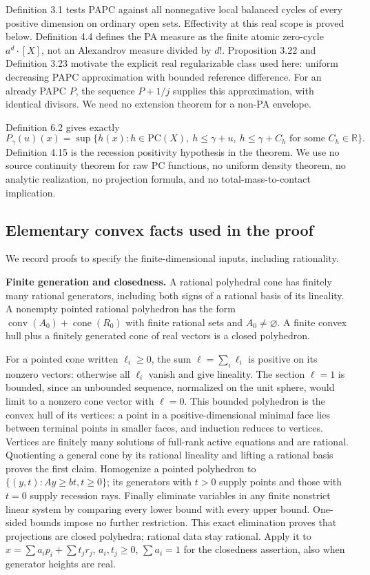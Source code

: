 \documentclass[
  11pt,
]{article}
\begin{document}
Definition 3.1 tests PAPC against all nonnegative local balanced cycles
of every positive dimension on ordinary open sets. Effectivity at this
real scope is proved below. Definition 4.4 defines the PA measure as the
finite atomic zero-cycle \(a^d\cdot[X]\), not an Alexandrov measure
divided by \(d!\). Proposition 3.22 and Definition 3.23 motivate the
explicit real regularizable class used here: uniform decreasing PAPC
approximation with bounded reference difference. For an already PAPC
\(P\), the sequence \(P+1/j\) supplies this approximation, with
identical divisors. We need no extension theorem for a non-PA envelope.

Definition 6.2 gives exactly \[
P_\gamma(u)(x)=\sup\{h(x):h\in\mathrm{PC}(X),\ h\leq\gamma+u,
\ h\leq\gamma+C_h\text{ for some }C_h\in\mathbb R\}.
\tag{E}
\] Definition 4.15 is the recession positivity hypothesis in the
theorem. We use no source continuity theorem for raw PC functions, no
uniform density theorem, no analytic realization, no projection formula,
and no total-mass-to-contact implication.

\subsection{Elementary convex facts used in the
proof}\label{elementary-convex-facts-used-in-the-proof}

We record proofs to specify the finite-dimensional inputs, including
rationality.

\textbf{Finite generation and closedness.} A rational polyhedral cone
has finitely many rational generators, including both signs of a
rational basis of its lineality. A nonempty pointed rational polyhedron
has the form \(\operatorname{conv}(A_0)+\operatorname{cone}(R_0)\) with
finite rational sets and \(A_0\ne\varnothing\). A finite convex hull
plus a finitely generated cone of real vectors is a closed polyhedron.

For a pointed cone written \(\ell_i\geq0\), the sum
\(\ell=\sum_i\ell_i\) is positive on its nonzero vectors: otherwise all
\(\ell_i\) vanish and give lineality. The section \(\ell=1\) is bounded,
since an unbounded sequence, normalized on the unit sphere, would limit
to a nonzero cone vector with \(\ell=0\). This bounded polyhedron is the
convex hull of its vertices: a point in a positive-dimensional minimal
face lies between terminal points in smaller faces, and induction
reduces to vertices. Vertices are finitely many solutions of full-rank
active equations and are rational. Quotienting a general cone by its
rational lineality and lifting a rational basis proves the first claim.
Homogenize a pointed polyhedron to \(\{(y,t):Ay\geq bt,t\geq0\}\); its
generators with \(t>0\) supply points and those with \(t=0\) supply
recession rays. Finally eliminate variables in any finite nonstrict
linear system by comparing every lower bound with every upper bound.
One-sided bounds impose no further restriction. This exact elimination
proves that projections are closed polyhedra; rational data stay
rational. Apply it to \(x=\sum a_ip_i+\sum t_jr_j\), \(a_i,t_j\geq0\),
\(\sum a_i=1\) for the closedness assertion, also when generator heights
are real.
\end{document}
